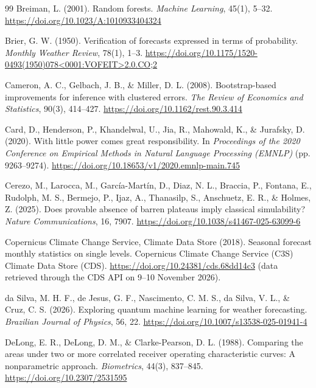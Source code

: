 \documentclass[11pt,a4paper]{article}
\begin{document}
\begin{thebibliography}{99}
Breiman, L. (2001). Random forests. \textit{Machine Learning}, 45(1), 5--32. \url{https://doi.org/10.1023/A:1010933404324}

Brier, G. W. (1950). Verification of forecasts expressed in terms of probability. \textit{Monthly Weather Review}, 78(1), 1--3. \url{https://doi.org/10.1175/1520-0493(1950)078<0001:VOFEIT>2.0.CO;2}

Cameron, A. C., Gelbach, J. B., \& Miller, D. L. (2008). Bootstrap-based improvements for inference with clustered errors. \textit{The Review of Economics and Statistics}, 90(3), 414--427. \url{https://doi.org/10.1162/rest.90.3.414}

Card, D., Henderson, P., Khandelwal, U., Jia, R., Mahowald, K., \& Jurafsky, D. (2020). With little power comes great responsibility. In \textit{Proceedings of the 2020 Conference on Empirical Methods in Natural Language Processing (EMNLP)} (pp. 9263--9274). \url{https://doi.org/10.18653/v1/2020.emnlp-main.745}

Cerezo, M., Larocca, M., Garc\'ia-Mart\'in, D., Diaz, N. L., Braccia, P., Fontana, E., Rudolph, M. S., Bermejo, P., Ijaz, A., Thanasilp, S., Anschuetz, E. R., \& Holmes, Z. (2025). Does provable absence of barren plateaus imply classical simulability? \textit{Nature Communications}, 16, 7907. \url{https://doi.org/10.1038/s41467-025-63099-6}

Copernicus Climate Change Service, Climate Data Store (2018). Seasonal forecast monthly statistics on single levels. Copernicus Climate Change Service (C3S) Climate Data Store (CDS). \url{https://doi.org/10.24381/cds.68dd14c3} (data retrieved through the CDS API on 9--10 November 2026).

da Silva, M. H. F., de Jesus, G. F., Nascimento, C. M. S., da Silva, V. L., \& Cruz, C. S. (2026). Exploring quantum machine learning for weather forecasting. \textit{Brazilian Journal of Physics}, 56, 22. \url{https://doi.org/10.1007/s13538-025-01941-4}

DeLong, E. R., DeLong, D. M., \& Clarke-Pearson, D. L. (1988). Comparing the areas under two or more correlated receiver operating characteristic curves: A nonparametric approach. \textit{Biometrics}, 44(3), 837--845. \url{https://doi.org/10.2307/2531595}


\end{thebibliography}
\end{document}
